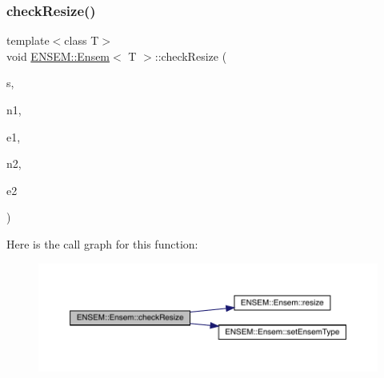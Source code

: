 \subsubsection{\texorpdfstring{checkResize()}{checkResize()}\hspace{0.1cm}{\footnotesize\ttfamily [4/6]}}
{\footnotesize\ttfamily template$<$class T$>$ \\
void \mbox{\hyperlink{classENSEM_1_1Ensem}{E\+N\+S\+E\+M\+::\+Ensem}}$<$ T $>$\+::check\+Resize (\begin{DoxyParamCaption}\item[{const char $\ast$}]{s,  }\item[{int}]{n1,  }\item[{\mbox{\hyperlink{namespaceENSEM_a2dc2c4a26884f343471e52f23479ddbe}{Ensem\+Type\+\_\+t}}}]{e1,  }\item[{int}]{n2,  }\item[{\mbox{\hyperlink{namespaceENSEM_a2dc2c4a26884f343471e52f23479ddbe}{Ensem\+Type\+\_\+t}}}]{e2 }\end{DoxyParamCaption})\hspace{0.3cm}{\ttfamily [inline]}}

Here is the call graph for this function\+:
\nopagebreak
\begin{figure}[H]
\begin{center}
\leavevmode
\includegraphics[width=350pt]{d7/d3e/classENSEM_1_1Ensem_acb139b6e03db52a9190de9ea4830addb_cgraph}
\end{center}
\end{figure}
\mbox{\label{classENSEM_1_1Ensem_a893d2925ef3c942b9d25b0a6e6db619c}} 
